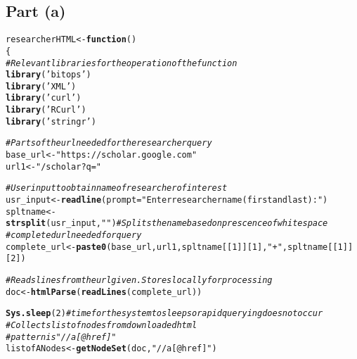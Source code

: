 \documentclass{article}\usepackage[]{graphicx}\usepackage[]{color}
\makeatletter
\newcommand{\hlnum}[1]{\textcolor[rgb]{0.686,0.059,0.569}{#1}}%
\newcommand{\hlstr}[1]{\textcolor[rgb]{0.192,0.494,0.8}{#1}}%
\newcommand{\hlcom}[1]{\textcolor[rgb]{0.678,0.584,0.686}{\textit{#1}}}%
\newcommand{\hlstd}[1]{\textcolor[rgb]{0.345,0.345,0.345}{#1}}%
\newcommand{\hlkwa}[1]{\textcolor[rgb]{0.161,0.373,0.58}{\textbf{#1}}}%
\newcommand{\hlkwb}[1]{\textcolor[rgb]{0.69,0.353,0.396}{#1}}%
\newcommand{\hlkwc}[1]{\textcolor[rgb]{0.333,0.667,0.333}{#1}}%
\newcommand{\hlkwd}[1]{\textcolor[rgb]{0.737,0.353,0.396}{\textbf{#1}}}%
\newenvironment{kframe}{%
 \def\at@end@of@kframe{}%
 \ifinner\ifhmode%
  \def\at@end@of@kframe{\end{minipage}}%
  \begin{minipage}{\columnwidth}%
 \fi\fi%
 \def\FrameCommand##1{\hskip\@totalleftmargin \hskip-\fboxsep
 \colorbox{shadecolor}{##1}\hskip-\fboxsep
     \hskip-\linewidth \hskip-\@totalleftmargin \hskip\columnwidth}%
 \MakeFramed {\advance\hsize-\width
   \@totalleftmargin\z@ \linewidth\hsize
   \@setminipage}}%
 {\par\unskip\endMakeFramed%
 \at@end@of@kframe}
\newenvironment{knitrout}{}{} %
\makeatother
\begin{document}
\subsection{Part (a)}
\begin{knitrout}
\color{fgcolor}\begin{kframe}
\begin{alltt}
\hlstd{researcherHTML}\hlkwb{<-}\hlkwa{function}\hlstd{()}
\hlstd{\{}
  \hlcom{#Relevant libraries for the operation of the function}
  \hlkwd{library}\hlstd{(}\hlstr{'bitops'}\hlstd{)}
  \hlkwd{library}\hlstd{(}\hlstr{'XML'}\hlstd{)}
  \hlkwd{library}\hlstd{(}\hlstr{'curl'}\hlstd{)}
  \hlkwd{library}\hlstd{(}\hlstr{'RCurl'}\hlstd{)}
  \hlkwd{library}\hlstd{(}\hlstr{'stringr'}\hlstd{)}

  \hlcom{#Parts of the url needed for the researcher query}
  \hlstd{base_url}\hlkwb{<-}\hlstr{"https://scholar.google.com"}
  \hlstd{url1}\hlkwb{<-}\hlstr{"/scholar?q="}

  \hlcom{#User input to obtain name of researcher of interest}
  \hlstd{usr_input}\hlkwb{<-}\hlkwd{readline}\hlstd{(}\hlkwc{prompt}\hlstd{=}\hlstr{"Enter researcher name (first and last): "}\hlstd{)}
  \hlstd{spltname}\hlkwb{<-}\hlkwd{strsplit}\hlstd{(usr_input,} \hlstr{" "}\hlstd{)} \hlcom{#Splits the name based on prescence of whitespace}
  \hlcom{#completed url needed for query}
  \hlstd{complete_url}\hlkwb{<-}\hlkwd{paste0}\hlstd{(base_url,url1,spltname[[}\hlnum{1}\hlstd{]][}\hlnum{1}\hlstd{],}\hlstr{"+"}\hlstd{,spltname[[}\hlnum{1}\hlstd{]][}\hlnum{2}\hlstd{])}

  \hlcom{#Reads lines from the url given. Stores locally for processing}
  \hlstd{doc}\hlkwb{<-}\hlkwd{htmlParse}\hlstd{(}\hlkwd{readLines}\hlstd{(complete_url))}

  \hlkwd{Sys.sleep}\hlstd{(}\hlnum{2}\hlstd{)} \hlcom{#time for the system to sleep so rapid querying does not occur}
  \hlcom{#Collects list of nodes from downloaded html}
  \hlcom{#pattern is "//a[@href]"}
  \hlstd{listofANodes}\hlkwb{<-}\hlkwd{getNodeSet}\hlstd{(doc,} \hlstr{"//a[@href]"}\hlstd{)}


\end{alltt}
\end{kframe}
\end{knitrout}
\end{document}
